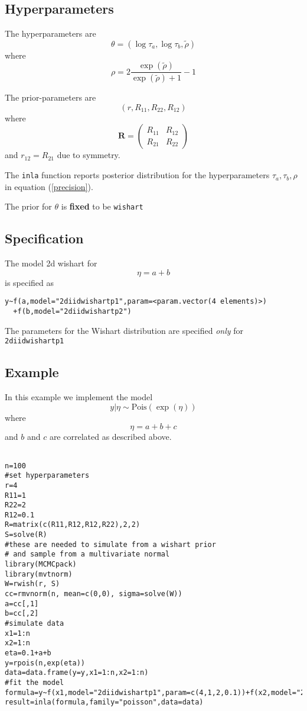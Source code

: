 \documentclass[a4paper,11pt]{article}
\begin{document}
\subsection*{Hyperparameters}

The hyperparameters are
\begin{displaymath}
    \theta = (\log\tau_{a}, \log\tau_{b}, \tilde\rho)
\end{displaymath}
where
\begin{displaymath}
    \rho =
    2\frac{\exp(\tilde\rho)}{\exp(\tilde{\rho})+1} -1
\end{displaymath}

The prior-parameters are
\[
(r,R_{11},R_{22},R_{12})
\]
where
\[
\mathbf{R}= \left(\begin{array}{cc}
      R_{11} &R_{12}\\
      R_{21} & R_{22}
  \end{array}\right)
\]
and $r_{12}=R_{21}$ due to symmetry.

The {\tt inla} function reports posterior distribution for the
hyperparameters $\tau_a,\tau_b,\rho$ in equation (\ref{precision}).

The prior for $\theta$ is {\bf fixed} to be {\tt wishart}


\subsection*{Specification}

The model 2d wishart for
\[
\eta=a+b
\]
is specified as
\begin{verbatim}
y~f(a,model="2diidwishartp1",param=<param.vector(4 elements)>) 
  +f(b,model="2diidwishartp2")
\end{verbatim}
The parameters for the Wishart distribution are specified {\it only}
for {\tt 2diidwishartp1}



\subsection*{Example}
In this example we implement the model
\[
y|\eta\sim\mbox{Pois}(\exp(\eta))
\]
where
\[
\eta=a+b+c
\]
and $b$ and $c$ are correlated as described above.

\begin{verbatim}

n=100
#set hyperparameters
r=4
R11=1
R22=2
R12=0.1
R=matrix(c(R11,R12,R12,R22),2,2)
S=solve(R)
#these are needed to simulate from a wishart prior
# and sample from a multivariate normal
library(MCMCpack)
library(mvtnorm)
W=rwish(r, S)
cc=rmvnorm(n, mean=c(0,0), sigma=solve(W))
a=cc[,1]
b=cc[,2]
#simulate data
x1=1:n
x2=1:n
eta=0.1+a+b
y=rpois(n,exp(eta))
data=data.frame(y=y,x1=1:n,x2=1:n)
#fit the model
formula=y~f(x1,model="2diidwishartp1",param=c(4,1,2,0.1))+f(x2,model="2diidwishartp2")
result=inla(formula,family="poisson",data=data)

\end{verbatim}
\end{document}
